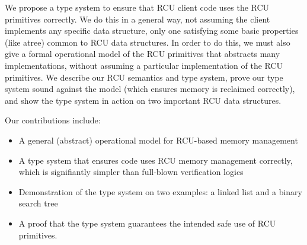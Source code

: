 We propose a type system to ensure that RCU client code uses the RCU primitives correctly.
We do this in a general way, not assuming the client implements any specific data structure, only one satisfying some basic properties (like atree) common to RCU data structures.  In order to do this, we must also give a formal operational model of the RCU primitives that abstracts many implementations, without assuming a particular implementation of the RCU primitives.
We describe our RCU semantics and type system, prove our type system sound against the model (which ensures memory is reclaimed correctly), and show the type system in action on two important RCU data structures.

Our contributions include:
\begin{itemize}
\item A general (abstract) operational model for RCU-based memory management
\item A type system that ensures code uses RCU memory management correctly, which is signifiantly simpler than full-blown verification logics
\item Demonstration of the type system on two examples: a linked list and a binary search tree  
\item A proof that the type system guarantees the intended safe use of RCU primitives.
\end{itemize}
